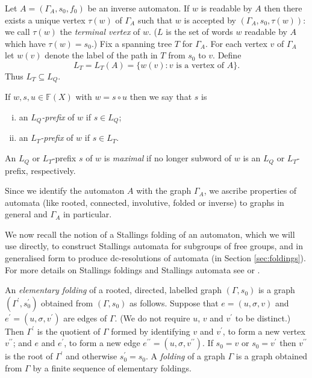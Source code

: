 \documentclass[a4paper,12pt]{article}
\newcommand{\G}{\Gamma }
\newcommand{\s}{\sigma }
\renewcommand{\t}{\tau }
\numberwithin{equation}{section}
\numberwithin{figure}{section}
\newcommand{\FF}{\ensuremath{\mathbb{F}}}
\newcommand{\be}{\begin{enumerate}}
\newcommand{\ee}{\end{enumerate}}
\begin{document}
Let $A=(\G_A,s_0,f_0)$ be an inverse automaton.
If $w$ is readable by $A$ then there exists a
unique vertex  $\t(w)$ of $\G_A$ such that $w$ is accepted by
$(\G_A,s_0,\t(w))$: we call $\t(w)$ the {\em terminal vertex} of $w$. ($L$ is the set of words $w$ readable by $A$ which have 
$\t(w)=s_0$.)
Fix a spanning tree $T$ for $\G_A$. For each vertex $v$ of $\G_A$
let $w(v)$ denote the label of the path in
$T$ from $s_0$ to $v$.  Define
\[L_T=L_T(A)=\{w(v): v \textrm{ is a vertex of } A\}.\]
Thus $L_T\subseteq L_Q$.

If $w, s, u\in \FF(X)$ with $w=s\circ u$ then we say that $s$ is
\be[(i)]
\item
 an $L_Q${\em -prefix} of $w$ if $s\in L_Q$;
\item
an %
$L_T${\em -prefix} of $w$ if $s\in L_T$.
\ee
An $L_Q$ or $L_T$-prefix $s$ of $w$ is  {\em maximal} if no longer
subword of $w$ is an $L_Q$ or $L_T$-prefix, respectively.

Since we identify the automaton $A$ with the graph $\G_A$, we
ascribe properties of automata (like rooted, connected,
involutive, folded or inverse) to graphs in general and $\G_A$ in
particular.

We now recall the notion of a Stallings folding of an automaton,
which we will use directly, to construct Stallings automata for
subgroups of free groups, and in generalised form to produce
dc-resolutions of automata (in Section \ref{sec:foldings}). For
more details on Stallings foldings  and  Stallings automata  see
\cite{ventura11} or \cite{BartholdiSilva}.

An {\em elementary folding} of a rooted, directed, labelled
graph $(\G,s_0)$ is a
graph $(\G^\prime,s^\prime_0)$ obtained from $(\G,s_0)$ as
follows. Suppose that $e=(u, \s, v)$ and $e^\prime=(u, \s,
v^\prime)$ are edges of $\G$. (We do not require $u$, $v$ and
$v^\prime$ to be distinct.)
 Then $\G^\prime$ is the quotient of $\G$ formed by identifying
$v$ and $v^\prime$, to form a new vertex $v^{\prime\prime}$; and
$e$ and $e^\prime$, to form a new edge $e^{\prime\prime}=(u, \s,
v^{\prime\prime})$. If $s_0= v$ or $s_0 = v^\prime$ then
$v^{\prime\prime}$ is the root of $\G^\prime$ and otherwise
$s^\prime_0=s_0$.
 A {\em folding} of a graph $\G$ is a graph obtained
from $\G$ by a finite sequence of elementary foldings.
\end{document}
